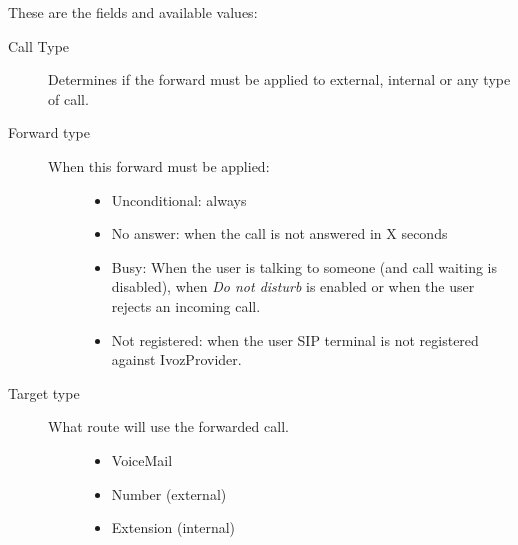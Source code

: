 \documentclass[letterpaper,10pt,english]{sphinxmanual}
\begin{document}
These are the fields and available values:
\begin{description}
\item[{Call Type}] \leavevmode{}\label{administration_portal/client/vpbx/users:term-call-type}
Determines if the forward must be applied to external, internal or any
type of call.

\item[{Forward type}] \leavevmode{}\label{administration_portal/client/vpbx/users:term-forward-type}\begin{description}
\item[{When this forward must be applied:}] \leavevmode\begin{itemize}
\item {} 
Unconditional: always

\item {} 
No answer: when the call is not answered in X seconds

\item {} 
Busy: When the user is talking to someone (and call waiting is
disabled), when \emph{Do not disturb} is enabled or when the user
rejects an incoming call.

\item {} 
Not registered: when the user SIP terminal is not registered
against IvozProvider.

\end{itemize}

\end{description}

\item[{Target type}] \leavevmode{}\label{administration_portal/client/vpbx/users:term-target-type}\begin{description}
\item[{What route will use the forwarded call.}] \leavevmode\begin{itemize}
\item {} 
VoiceMail

\item {} 
Number (external)

\item {} 
Extension (internal)

\end{itemize}

\end{description}

\end{description}
\end{document}

